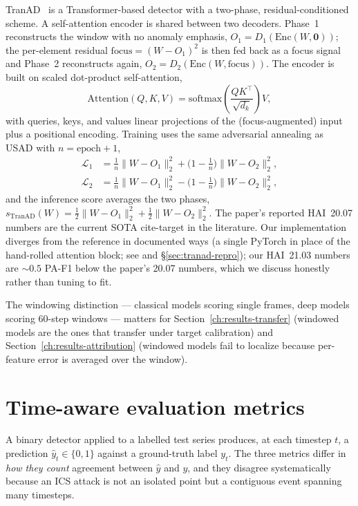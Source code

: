 TranAD~\cite{tuli2022tranad} is a Transformer-based detector with a two-phase, residual-conditioned scheme.  A self-attention encoder is shared between two decoders.  Phase~1 reconstructs the window with no anomaly emphasis, $O_1 = D_1(\mathrm{Enc}(W, \mathbf{0}))$; the per-element residual $\mathrm{focus} = (W - O_1)^{2}$ is then fed back as a focus signal and Phase~2 reconstructs again, $O_2 = D_2(\mathrm{Enc}(W, \mathrm{focus}))$.  The encoder is built on scaled dot-product self-attention,
\begin{equation}
  \mathrm{Attention}(Q,K,V) = \mathrm{softmax}\!\left(\frac{QK^{\top}}{\sqrt{d_k}}\right)V,
\end{equation}
with queries, keys, and values linear projections of the (focus-augmented) input plus a positional encoding.  Training uses the same adversarial annealing as USAD with $n = \text{epoch}+1$,
\begin{align}
  \mathcal{L}_1 &= \tfrac{1}{n}\lVert W - O_1\rVert_2^{2} + \bigl(1 - \tfrac{1}{n}\bigr)\lVert W - O_2\rVert_2^{2}, \\
  \mathcal{L}_2 &= \tfrac{1}{n}\lVert W - O_1\rVert_2^{2} - \bigl(1 - \tfrac{1}{n}\bigr)\lVert W - O_2\rVert_2^{2},
\end{align}
and the inference score averages the two phases, $s_{\mathrm{TranAD}}(W) = \tfrac{1}{2}\lVert W - O_1\rVert_2^{2} + \tfrac{1}{2}\lVert W - O_2\rVert_2^{2}$.  The paper's reported HAI~20.07 numbers are the current SOTA cite-target in the literature.  Our implementation diverges from the reference in documented ways (a single PyTorch  in place of the hand-rolled attention block; see  and \S\ref{sec:tranad-repro}); our HAI~21.03 numbers are $\sim 0.5$ PA-F1 below the paper's 20.07 numbers, which we discuss honestly rather than tuning to fit.

The windowing distinction --- classical models scoring single frames, deep models scoring $60$-step windows --- matters for Section~\ref{ch:results-transfer} (windowed models are the ones that transfer under target calibration) and Section~\ref{ch:results-attribution} (windowed models fail to localize because per-feature error is averaged over the window).

\section{Time-aware evaluation metrics}
\label{sec:metrics}

A binary detector applied to a labelled test series produces, at each timestep $t$, a prediction $\hat{y}_t \in \{0,1\}$ against a ground-truth label $y_t$.  The three metrics differ in \emph{how they count} agreement between $\hat{y}$ and $y$, and they disagree systematically because an ICS attack is not an isolated point but a contiguous event spanning many timesteps.

